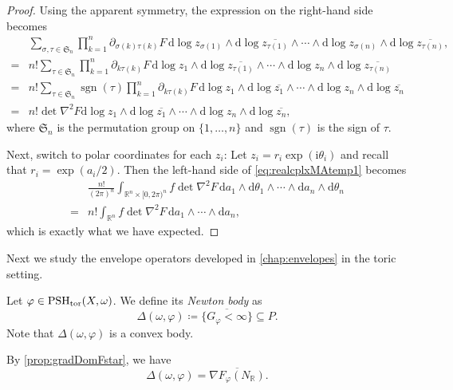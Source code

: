 \begin{proof}
    Using the apparent symmetry, the expression on the right-hand side becomes
    \[
    \begin{aligned}
    &\sum_{\sigma,\tau\in \mathfrak{S}_n}\prod_{k=1}^n \partial_{\sigma(k)\tau(k)}F\,\mathrm{d}\log z_{\sigma(1)}\wedge \mathrm{d}\log \overline{z_{\tau(1)}}\wedge \cdots\wedge \mathrm{d}\log z_{\sigma(n)}\wedge \mathrm{d}\log \overline{z_{\tau(n)}},\\
    =& n!\sum_{\tau\in \mathfrak{S}_n}\prod_{k=1}^n \partial_{k\tau(k)}F\,\mathrm{d}\log z_{1}\wedge \mathrm{d}\log \overline{z_{\tau(1)}}\wedge \cdots\wedge \mathrm{d}\log z_{n}\wedge \mathrm{d}\log \overline{z_{\tau(n)}}\\
    =& n!\sum_{\tau\in \mathfrak{S}_n}\operatorname{sgn}(\tau)\prod_{k=1}^n \partial_{k\tau(k)}F\,\mathrm{d}\log z_{1}\wedge \mathrm{d}\log \overline{z_1}\wedge \cdots\wedge \mathrm{d}\log z_{n}\wedge \mathrm{d}\log \overline{z_n}\\
    =& n! \det \nabla^2 F\mathrm{d}\log z_{1}\wedge \mathrm{d}\log \overline{z_1}\wedge \cdots\wedge \mathrm{d}\log z_{n}\wedge \mathrm{d}\log \overline{z_n},
    \end{aligned}
    \]
    where $\mathfrak{S}_n$ is the permutation group on $\{1,\ldots,n\}$ and $\operatorname{sgn}(\tau)$ is the sign of $\tau$.

    Next, switch to polar coordinates for each $z_i$: Let $z_i=r_i\exp(\mathrm{i}\theta_i)$ and recall that $r_i=\exp(a_i/2)$. Then the left-hand side of \eqref{eq:realcplxMAtemp1} becomes
    \[
    \begin{split}
    &\frac{n!}{(2\pi)^n}\int_{\mathbb{R}^n\times [0,2\pi)^n} f \det \nabla^2 F \,\mathrm{d}a_1\wedge \mathrm{d}\theta_1\wedge \cdots\wedge \mathrm{d}a_n\wedge \mathrm{d}\theta_n\\
    =& n!\int_{\mathbb{R}^n}f\det \nabla^2 F \,\mathrm{d}a_1\wedge \cdots \wedge\mathrm{d}a_n,
    \end{split}
    \]
    which is exactly what we have expected.
\end{proof}

Next we study the envelope operators developed in \cref{chap:envelopes} in the toric setting.
\begin{definition}\label{def:Newtonbody1}
    Let $\varphi\in \mathrm{PSH}_{\mathrm{tor}}(X,\omega)$. We define its \emph{Newton body} as
    \[
    \Delta(\omega,\varphi)\coloneqq \overline{\{G_{\varphi}<\infty\}}\subseteq P.
    \]
    \index{$\Delta(\omega,\varphi)$}
    Note that $\Delta(\omega,\varphi)$ is a convex body.
\end{definition}
By \cref{prop:gradDomFstar}, we have
\[
\Delta(\omega,\varphi)=\overline{\nabla F_{\varphi}(N_{\mathbb{R}})}.
\]

